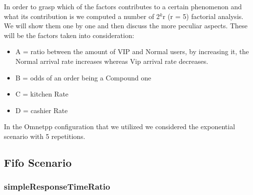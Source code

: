 In order to grasp which of the factors contributes to a certain phenomenon and what its contribution is we computed a number of 2$^k$r (r = 5) factorial analysis. We will show them one by one and then discuss the more peculiar aspects. These will be the factors taken into consideration: 
  \begin{itemize}
    \item A = ratio between the amount of VIP and Normal users, by increasing it, the Normal arrival rate increases whereas Vip arrival rate decreases.
    \item B = odds of an order being a Compound one
    \item C = kitchen Rate
    \item D = cashier Rate
  \end{itemize}
In the Omnetpp configuration that we utilized we considered the exponential scenario with 5 repetitions.

\subsection{Fifo Scenario}

\subsubsection{simpleResponseTimeRatio}


 
